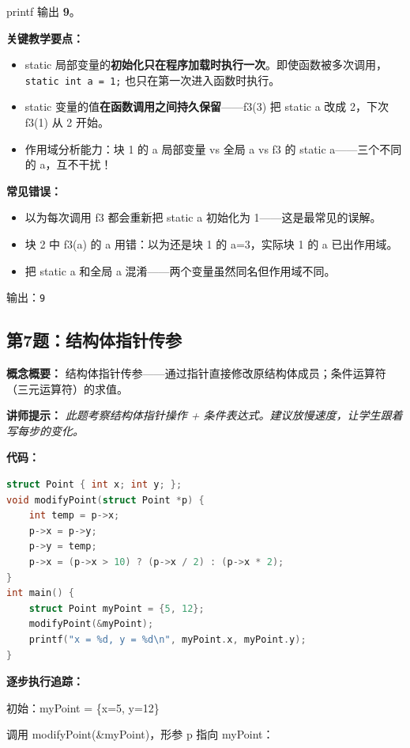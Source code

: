 \noindent printf 输出 \textbf{9}。

\textbf{关键教学要点：}
\begin{itemize}
    \item static 局部变量的\textbf{初始化只在程序加载时执行一次}。即使函数被多次调用，\texttt{static int a = 1;} 也只在第一次进入函数时执行。
    \item static 变量的值\textbf{在函数调用之间持久保留}——f3(3) 把 static a 改成 2，下次 f3(1) 从 2 开始。
    \item 作用域分析能力：块 1 的 a 局部变量 vs 全局 a vs f3 的 static a——三个不同的 a，互不干扰！
\end{itemize}

\textbf{常见错误：}
\begin{itemize}
    \item 以为每次调用 f3 都会重新把 static a 初始化为 1——这是最常见的误解。
    \item 块 2 中 f3(a) 的 a 用错：以为还是块 1 的 a=3，实际块 1 的 a 已出作用域。
    \item 把 static a 和全局 a 混淆——两个变量虽然同名但作用域不同。
\end{itemize}

{\color{highlight}输出：\texttt{9}}

\subsection{第7题：结构体指针传参}

\textbf{概念概要：} 结构体指针传参——通过指针直接修改原结构体成员；条件运算符（三元运算符）的求值。

\medskip
\textbf{讲师提示：} \textit{此题考察结构体指针操作 + 条件表达式。建议放慢速度，让学生跟着写每步的变化。}

\smallskip
\textbf{代码：}
\begin{lstlisting}[language=C]
struct Point { int x; int y; };
void modifyPoint(struct Point *p) {
    int temp = p->x;
    p->x = p->y;
    p->y = temp;
    p->x = (p->x > 10) ? (p->x / 2) : (p->x * 2);
}
int main() {
    struct Point myPoint = {5, 12};
    modifyPoint(&myPoint);
    printf("x = %d, y = %d\n", myPoint.x, myPoint.y);
}
\end{lstlisting}

\smallskip
\textbf{逐步执行追踪：}

\noindent 初始：myPoint = \{x=5, y=12\}

\noindent 调用 modifyPoint(\&myPoint)，形参 p 指向 myPoint：

